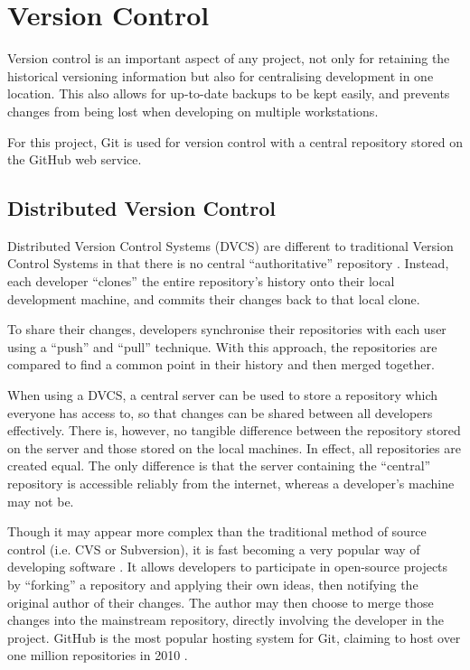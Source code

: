 \section{Version Control}
\label{sec:implementation-versioncontrol}

Version control is an important aspect of any project, not only for retaining
the historical versioning information but also for centralising development in
one location. This also allows for up-to-date backups to be kept easily, and
prevents changes from being lost when developing on multiple workstations.

For this project, Git is used for version control with a central repository
stored on the GitHub web service.

\subsection{Distributed Version Control}

Distributed Version Control Systems (DVCS) are different to traditional Version
Control Systems in that there is no central ``authoritative'' repository
\cite{robert2006}. Instead, each developer ``clones'' the entire repository's
history onto their local development machine, and commits their changes back to
that local clone.

To share their changes, developers synchronise their repositories with each
user using a ``push'' and ``pull'' technique. With this approach, the
repositories are compared to find a common point in their history and then
merged together.

When using a DVCS, a central server can be used to store a repository which
everyone has access to, so that changes can be shared between all developers
effectively. There is, however, no tangible difference between the repository
stored on the server and those stored on the local machines. In effect, all
repositories are created equal. The only difference is that the server
containing the ``central'' repository is accessible reliably from the internet,
whereas a developer's machine may not be.

Though it may appear more complex than the traditional method of source control
(i.e. CVS or Subversion), it is fast becoming a very popular way of developing
software \cite{takhteyev2010}. It allows developers to participate in
open-source projects by ``forking'' a repository and applying their own ideas,
then notifying the original author of their changes. The author may then choose
to merge those changes into the mainstream repository, directly involving the
developer in the project. GitHub \cite{Github} is the most popular hosting
system for Git, claiming to host over one million repositories in 2010
\cite{takhteyev2010}.

